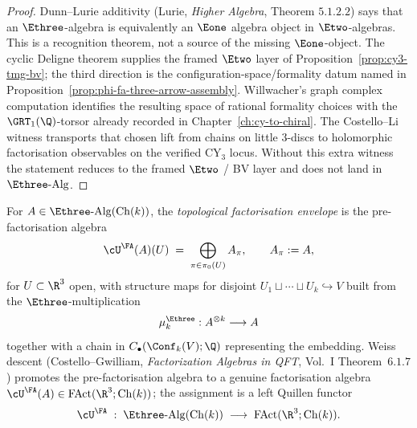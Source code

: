 \begin{proof}
Dunn--Lurie additivity (Lurie, \emph{Higher Algebra}, Theorem
$5.1.2.2$) says that an $\Ethree$-algebra is equivalently an $\Eone$
algebra object in $\Etwo$-algebras. This is a recognition theorem, not
a source of the missing $\Eone$-object. The cyclic Deligne theorem
supplies the framed $\Etwo$ layer of
Proposition~\ref{prop:cy3-tmg-bv}; the third direction is the
configuration-space/formality datum named in
Proposition~\ref{prop:phi-fa-three-arrow-assembly}. Willwacher's graph
complex computation identifies the resulting space of rational
formality choices with the $\GRT_1(\Q)$-torsor already recorded in
Chapter~\ref{ch:cy-to-chiral}. The Costello--Li witness transports
that chosen lift from chains on little $3$-discs to holomorphic
factorisation observables on the verified CY$_3$ locus. Without this
extra witness the statement reduces to the framed $\Etwo$ / BV layer and
does not land in $\Ethree\text{-}\mathrm{Alg}$.
\end{proof}

\begin{definition}
\label{def:cy3-topological-envelope}
For $A\in\Ethree\text{-}\mathrm{Alg}(\mathrm{Ch}(k))$, the
\emph{topological factorisation envelope} is the pre-factorisation
algebra
\[
\cU^\FA(A)(U)\;=\;\bigoplus_{\pi\in\pi_0(U)}A_\pi,
\qquad A_\pi:=A,
\]
for $U\subset\R^3$ open, with structure maps for disjoint
$U_1\sqcup\cdots\sqcup U_k\hookrightarrow V$ built from the
$\Ethree$-multiplication
\[
\mu_k^{\Ethree}:A^{\otimes k}\longrightarrow A
\]
together with a chain in $C_\bullet(\Conf_k(V);\Q)$ representing the
embedding. Weiss descent (Costello--Gwilliam, \emph{Factorization
Algebras in QFT}, Vol.~I Theorem~$6.1.7$) promotes the
pre-factorisation algebra to a genuine factorisation algebra
$\cU^\FA(A)\in\mathrm{FAct}(\R^3;\mathrm{Ch}(k))$; the assignment is a
left Quillen functor
\[
\cU^\FA\;:\;\Ethree\text{-}\mathrm{Alg}(\mathrm{Ch}(k))\;\longrightarrow\;\mathrm{FAct}(\R^3;\mathrm{Ch}(k)).
\]
\end{definition}

